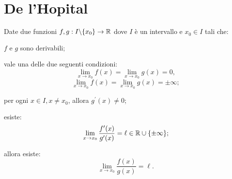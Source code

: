 \section{De l'Hopital}
\begin{teo}
Date due funzioni $f,g:I \backslash \{x_0\} \rightarrow \mathbb{R}$ dove $I$ è un intervallo e $x_0 \in I$ tali che:
\begin{aenumerate}
\item $f$ e $g$ sono derivabili;
\item vale una delle due seguenti condizioni:
\[\lim_{x\to x_0}{f(x)}=\lim_{x\to x_0}{g(x)}=0,\]
\[\lim_{x\to x_0}{f(x)}=\lim_{x\to x_0}{g(x)}=\pm\infty;\]
\item per ogni $x\in I, x\neq x_0$, allora $g^\prime(x)\neq 0$;
\item esiste:
\[\lim_{x\to x_0}{\frac{f^\prime(x)}{g^\prime(x)}}=\ell\in\mathbb{R}\cup\{\pm\infty\};\]
\end{aenumerate}
allora esiste:
\[\lim_{x\to x_0}{\frac{f(x)}{g(x)}}=\ell.\]
\end{teo}